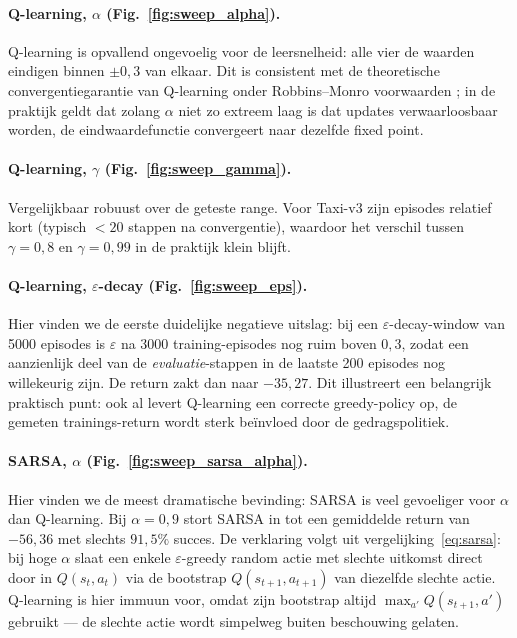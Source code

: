 \documentclass[11pt,a4paper]{article}
\begin{document}
\paragraph{Q-learning, $\alpha$ (Fig.~\ref{fig:sweep_alpha}).}
Q-learning is opvallend ongevoelig voor de leersnelheid: alle vier de
waarden eindigen binnen $\pm 0{,}3$ van elkaar. Dit is consistent met
de theoretische convergentiegarantie van Q-learning onder Robbins--Monro
voorwaarden \cite{sutton_barto_2018}; in de praktijk geldt dat zolang
$\alpha$ niet zo extreem laag is dat updates verwaarloosbaar worden,
de eindwaardefunctie convergeert naar dezelfde fixed point.

\paragraph{Q-learning, $\gamma$ (Fig.~\ref{fig:sweep_gamma}).}
Vergelijkbaar robuust over de geteste range. Voor Taxi-v3 zijn episodes
relatief kort (typisch $<20$ stappen na convergentie), waardoor het
verschil tussen $\gamma=0{,}8$ en $\gamma=0{,}99$ in de praktijk klein
blijft.

\paragraph{Q-learning, $\varepsilon$-decay (Fig.~\ref{fig:sweep_eps}).}
Hier vinden we de eerste duidelijke negatieve uitslag: bij een
$\varepsilon$-decay-window van 5000 episodes is $\varepsilon$ na 3000
training-episodes nog ruim boven $0{,}3$, zodat een aanzienlijk deel
van de \emph{evaluatie}-stappen in de laatste 200 episodes nog
willekeurig zijn. De return zakt dan naar $-35{,}27$. Dit illustreert
een belangrijk praktisch punt: ook al levert Q-learning een correcte
greedy-policy op, de gemeten trainings-return wordt sterk be\"invloed
door de gedragspolitiek.

\paragraph{SARSA, $\alpha$ (Fig.~\ref{fig:sweep_sarsa_alpha}).}
Hier vinden we de meest dramatische bevinding: SARSA is veel
gevoeliger voor $\alpha$ dan Q-learning. Bij $\alpha=0{,}9$ stort SARSA
in tot een gemiddelde return van $-56{,}36$ met slechts $91{,}5\%$
succes. De verklaring volgt uit vergelijking~\eqref{eq:sarsa}: bij
hoge $\alpha$ slaat een enkele $\varepsilon$-greedy random actie met
slechte uitkomst direct door in $Q(s_t, a_t)$ via de bootstrap
$Q(s_{t+1}, a_{t+1})$ van diezelfde slechte actie. Q-learning is hier
immuun voor, omdat zijn bootstrap altijd $\max_{a'} Q(s_{t+1}, a')$
gebruikt --- de slechte actie wordt simpelweg buiten beschouwing
gelaten.
\end{document}
